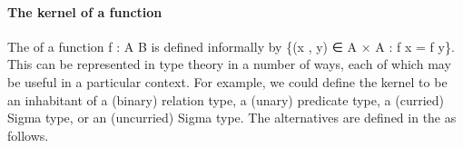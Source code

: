 \paragraph*{The kernel of a function}
The  of a function \ab f \as : \ab A  \ab B is defined informally by \{(\ab x , \ab y) ∈ \ab A × \ab A : \ab f \ab x = \ab f \ab y\}. This can be represented in type theory in a number of ways, each of which may be useful in a particular context. For example, we could define the kernel to be an inhabitant of a (binary) relation type, a (unary) predicate type, a (curried) Sigma type, or an (uncurried) Sigma type. The alternatives are defined in the \ualib as follows.
\ccpad
\begin{code}%
\>[1]\AgdaSpace{}%
\AgdaSymbol{:}\AgdaSpace{}%
\AgdaSymbol{(}\AgdaSpace{}%
\AgdaSpace{}%
\AgdaSymbol{)}\AgdaSpace{}%
\AgdaSpace{}%
\AgdaSpace{}%
\AgdaSpace{}%
\<%
\\
%
\>[1]\AgdaSpace{}%
\AgdaSpace{}%
\AgdaSpace{}%
\AgdaSpace{}%
\AgdaSymbol{=}\AgdaSpace{}%
\AgdaSpace{}%
\AgdaSpace{}%
\AgdaSpace{}%
\AgdaSpace{}%
\<%
\\
%
\\[\AgdaEmptyExtraSkip]%
%
\>[1]\AgdaSpace{}%
\AgdaSymbol{:}\AgdaSpace{}%
\AgdaSymbol{(}\AgdaSpace{}%
\AgdaSpace{}%
\AgdaSymbol{)}\AgdaSpace{}%
\AgdaSpace{}%
\AgdaSpace{}%
\AgdaSymbol{(}\AgdaSpace{}%
\AgdaSpace{}%
\AgdaSymbol{)}\AgdaSpace{}%
\<%
\\
%
\>[1]\AgdaSpace{}%
\AgdaSpace{}%
\AgdaSymbol{(}\AgdaSpace{}%
\AgdaOperator{\AgdaInductiveConstructor{,}}\AgdaSpace{}%
\AgdaSymbol{)}\AgdaSpace{}%
\AgdaSymbol{=}\AgdaSpace{}%
\AgdaSpace{}%
\AgdaSpace{}%
\AgdaSpace{}%
\AgdaSpace{}%
\<%
\\
%
\\[\AgdaEmptyExtraSkip]%
%
\>[1]\AgdaSpace{}%
\AgdaSymbol{:}\AgdaSpace{}%
\AgdaSymbol{(}\AgdaSpace{}%
\AgdaSpace{}%
\AgdaSymbol{)}\AgdaSpace{}%
\AgdaSpace{}%

\end{code}
